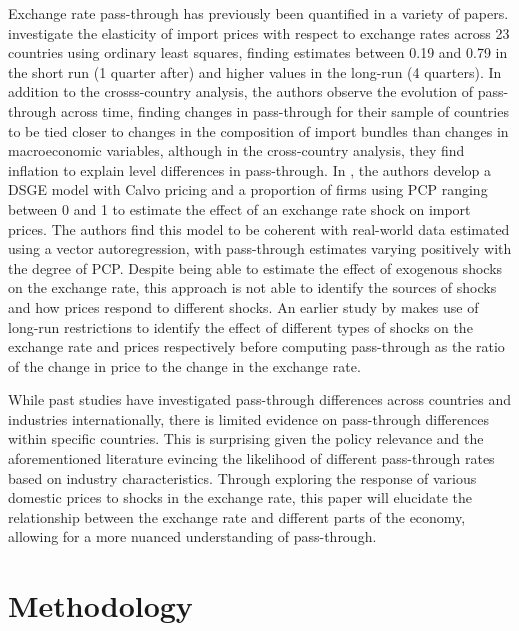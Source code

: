 \documentclass[12pt]{article}
\begin{document}
Exchange rate pass-through has previously been quantified in a variety of papers. \textcite{campa2005exchange} investigate the elasticity of import prices with respect to exchange rates across 23 countries using ordinary least squares, finding estimates between 0.19 and 0.79 in the short run (1 quarter after) and higher values in the long-run (4 quarters). In addition to the crosss-country analysis, the authors observe the evolution of pass-through across time, finding changes in pass-through for their sample of countries to be tied closer to changes in the composition of import bundles than changes in macroeconomic variables, although in the cross-country analysis, they find inflation to explain level differences in pass-through. In \textcite{choudhri2015exchange}, the authors develop a DSGE model with Calvo pricing and a proportion of firms using PCP ranging between 0 and 1 to estimate the effect of an exchange rate shock on import prices. The authors find this model to be coherent with real-world data estimated using a vector autoregression, with pass-through estimates varying positively with the degree of PCP. Despite being able to estimate the effect of exogenous shocks on the exchange rate, this approach is not able to identify the sources of shocks and how prices respond to different shocks. An earlier study by \textcite{shambaugh2008new} makes use of long-run restrictions to identify the effect of different types of shocks on the exchange rate and prices respectively before computing pass-through as the ratio of the change in price to the change in the exchange rate. 

While past studies have investigated pass-through differences across countries and industries internationally, there is limited evidence on pass-through differences within specific countries. This is surprising given the policy relevance and the aforementioned literature evincing the likelihood of different pass-through rates based on industry characteristics. Through exploring the response of various domestic prices to shocks in the exchange rate, this paper will elucidate the relationship between the exchange rate and different parts of the economy, allowing for a more nuanced understanding of pass-through. 

\section*{Methodology}
\end{document}

